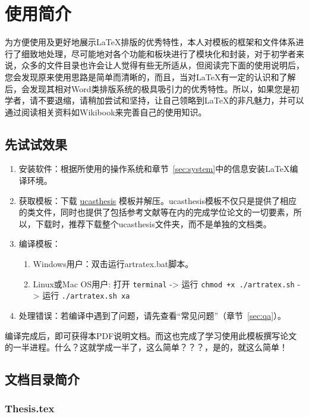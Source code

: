 
\chapter{使用简介}
\label{chap:guide}

为方便使用及更好地展示\LaTeX{}排版的优秀特性，本人对模板的框架和文件体系进行了细致地处理，尽可能地对各个功能和板块进行了模块化和封装，对于初学者来说，众多的文件目录也许会让人觉得有些无所适从，但阅读完下面的使用说明后，您会发现原来使用思路是简单而清晰的，而且，当对\LaTeX{}有一定的认识和了解后，会发现其相对Word类排版系统的极具吸引力的优秀特性。所以，如果您是初学者，请不要退缩，请稍加尝试和坚持，让自己领略到\LaTeX{}的非凡魅力，并可以通过阅读相关资料如Wikibook\citep{wikibook2014latex}来完善自己的使用知识。

\section{先试试效果}

\begin{enumerate}
    \item 安装软件：根据所使用的操作系统和章节~\ref{sec:system}中的信息安装\LaTeX{}编译环境。
    \item 获取模板：下载 \href{https://github.com/mohuangrui/ucasthesis}{ucasthesis} 模板并解压。ucasthesis模板不仅只是提供了相应的类文件，同时也提供了包括参考文献等在内的完成学位论文的一切要素，所以，下载时，推荐下载整个ucasthesis文件夹，而不是单独的文档类。
    \item 编译模板：
        \begin{enumerate}
            \item Windows用户：双击运行artratex.bat脚本。
            \item Linux或Mac OS用户: 打开 \verb|terminal| -> 运行 \verb|chmod +x ./artratex.sh| -> 运行 \verb|./artratex.sh xa|
        \end{enumerate}
    \item 处理错误：若编译中遇到了问题，请先查看“常见问题”（章节~\ref{sec:qa}）。
\end{enumerate}

编译完成后，即可获得本PDF说明文档。而这也完成了学习使用此模板撰写论文的一半进程。什么？这就学成一半了，这么简单？？？，是的，就这么简单！

\section{文档目录简介}

\subsection{Thesis.tex}

